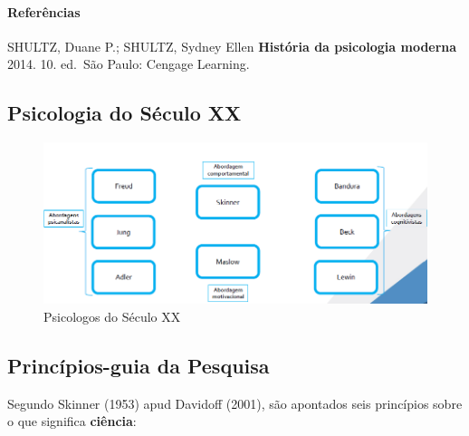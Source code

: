 \documentclass[
]{book}
\begin{document}
\hypertarget{referuxeancias}{%
\paragraph{Referências}\label{referuxeancias}}

SHULTZ, Duane P.; SHULTZ, Sydney Ellen \textbf{História da psicologia moderna} 2014. 10. ed.~São Paulo: Cengage Learning.

\hypertarget{psicologia-do-suxe9culo-xx}{%
\subsection{Psicologia do Século XX}\label{psicologia-do-suxe9culo-xx}}

\begin{figure}

{\centering \includegraphics[width=0.8\linewidth]{imagens/psicologos-do-seculo-xx} 

}

\caption{Psicologos do Século XX}\label{fig:unnamed-chunk-6}
\end{figure}

\hypertarget{princuxedpios-guia-da-pesquisa}{%
\subsection{Princípios-guia da Pesquisa}\label{princuxedpios-guia-da-pesquisa}}

Segundo Skinner (1953) apud Davidoff (2001), são apontados seis princípios sobre o que significa \textbf{ciência}:
\end{document}
